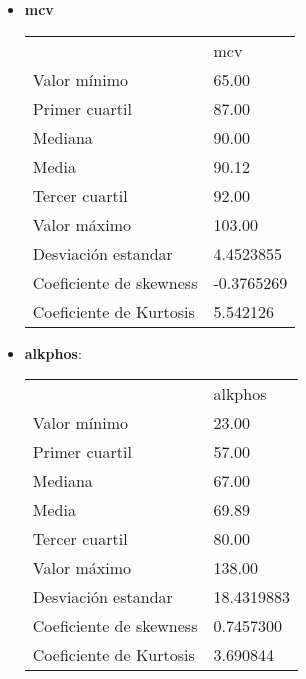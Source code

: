 \begin{itemize}
	\item \textbf{mcv}
	\begin{table}[]
		\begin{tabular}{ll}
			& mcv        \\
			Valor mínimo            & 65.00      \\
			Primer cuartil          & 87.00      \\
			Mediana                 & 90.00      \\
			Media                   & 90.12      \\
			Tercer cuartil          & 92.00      \\
			Valor máximo            & 103.00     \\ \hline
			Desviación estandar     & 4.4523855  \\ \hline
			Coeficiente de skewness & -0.3765269 \\
			Coeficiente de Kurtosis & 5.542126  
		\end{tabular}
	\end{table}
	
	
	\item \textbf{alkphos}: 
	\begin{table}[]
		\begin{tabular}{ll}
			& alkphos    \\
			Valor mínimo            & 23.00      \\
			Primer cuartil          & 57.00      \\
			Mediana                 & 67.00      \\
			Media                   & 69.89      \\
			Tercer cuartil          & 80.00      \\
			Valor máximo            & 138.00     \\ \hline
			Desviación estandar     & 18.4319883 \\ \hline
			Coeficiente de skewness & 0.7457300  \\
			Coeficiente de Kurtosis & 3.690844  
		\end{tabular}
	\end{table}
	

\end{itemize}
